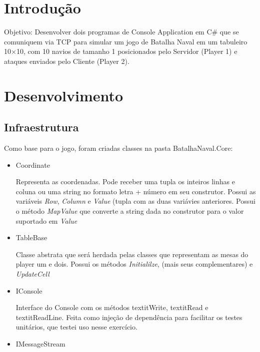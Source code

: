 \documentclass[
	12pt,				%
	oneside,			%
	a4paper,			%
	english,			%
	brazil,				%
	]{abntex2}
\begin{document}
\frenchspacing 

\imprimircapa

{
\ABNTEXchapterfont

\textual

\section{Introdução}

Objetivo: Desenvolver dois programas de Console Application em C# que se comuniquem via TCP para simular um jogo de Batalha Naval em um tabuleiro 10×10, com 10 navios de tamanho 1 posicionados pelo Servidor (Player 1) e ataques enviados pelo Cliente (Player 2).

\section{Desenvolvimento}

\subsection{Infraestrutura}

Como base para o jogo, foram criadas classes na pasta BatalhaNaval.Core:

\begin{itemize}
    \item Coordinate

    Representa as coordenadas. Pode receber uma tupla os inteiros linhas e coluna ou uma string no formato letra + número em seu construtor. Possui as variáveis \textit{Row}, \textit{Column} e \textit{Value} (tupla com as duas variávies anteriores. Possui o método \textit{MapValue} que converte a string dada no construtor para o valor suportado em \textit{Value}
    \item TableBase

    Classe abstrata que será herdada pelas classes que representam as mesas do player um e dois. Possui os métodos \textit{Initialilze},  (mais seus complementares) e \textit{UpdateCell}
    \item IConsole

    Interface do Console com os métodos textit{Write}, textit{Read} e textit{ReadLine}. Feita como injeção de dependência para facilitar os testes unitários, que testei uso nesse exercício.
    \item IMessageStream


\end{itemize}}
\end{document}
